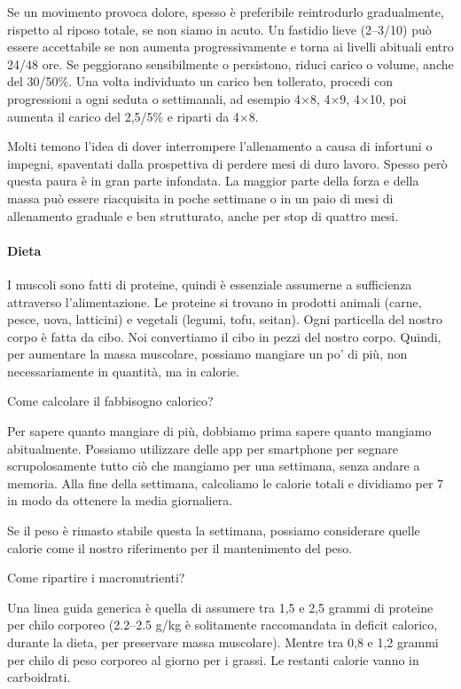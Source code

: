 \documentclass[12pt]{book} %
\begin{document}
Se un movimento provoca dolore, spesso è preferibile reintrodurlo gradualmente,  rispetto al riposo totale, se non siamo in acuto. Un fastidio lieve (2–3/10) può essere accettabile se non aumenta progressivamente e torna ai livelli abituali entro 24/48 ore. Se peggiorano sensibilmente o persistono, riduci carico o volume, anche del 30/50\%. Una volta individuato un carico ben tollerato, procedi con progressioni a ogni seduta o settimanali, ad esempio 4×8, 4×9, 4×10, poi aumenta il carico del 2,5/5\% e riparti da 4×8. 

Molti temono l'idea di dover interrompere l'allenamento a causa di infortuni o impegni, spaventati dalla prospettiva di perdere mesi di duro lavoro. Spesso però questa paura è in gran parte infondata. La maggior parte della forza e della massa può essere riacquisita in poche settimane o in un paio di mesi di allenamento graduale e ben strutturato, anche per stop di quattro mesi.

\paragraph{Dieta}
I muscoli sono fatti di proteine, quindi è essenziale assumerne a sufficienza attraverso l'alimentazione. Le proteine si trovano in prodotti animali (carne, pesce, uova, latticini) e vegetali (legumi, tofu, seitan).
Ogni particella del nostro corpo è fatta da cibo. Noi convertiamo il cibo in pezzi del nostro corpo. Quindi, per aumentare la massa muscolare, possiamo mangiare un po' di più, non necessariamente in quantità, ma in calorie.

Come calcolare il fabbisogno calorico?

Per sapere quanto mangiare di più, dobbiamo prima sapere quanto mangiamo abitualmente. Possiamo utilizzare delle app per smartphone per segnare scrupolosamente tutto ciò che mangiamo per una settimana, senza andare a memoria. Alla fine della settimana, calcoliamo le calorie totali e dividiamo per 7 in modo da ottenere la media giornaliera.

Se il peso è rimasto stabile questa la settimana, possiamo considerare quelle calorie come il nostro riferimento per il mantenimento del peso.

Come ripartire i macronutrienti?

Una linea guida generica è quella di assumere tra 1,5 e 2,5 grammi di proteine per chilo corporeo (2.2–2.5 g/kg è solitamente raccomandata in deficit calorico, durante la dieta, per preservare massa muscolare). Mentre tra 0,8 e 1,2 grammi per chilo di peso corporeo al giorno per i grassi. Le restanti calorie vanno in carboidrati.
\end{document}
